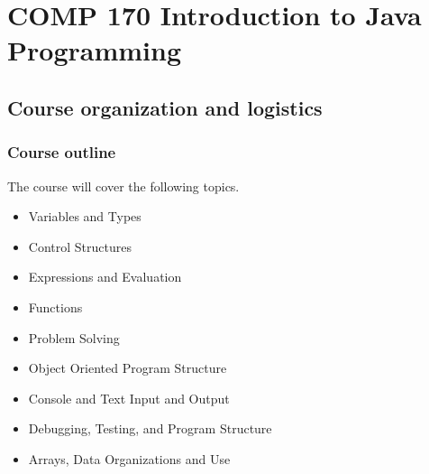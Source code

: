 \documentclass[letterpaper,10pt,english]{sphinxmanual}
\begin{document}
\chapter{COMP 170 Introduction to Java Programming}
\label{\detokenize{COMP170/introduction:comp-170-introduction-to-java-programming}}\label{\detokenize{COMP170/introduction::doc}}

\section{Course organization and logistics}
\label{\detokenize{COMP170/organization:course-organization-and-logistics}}\label{\detokenize{COMP170/organization::doc}}

\subsection{Course outline}
\label{\detokenize{COMP170/organization:course-outline}}
The course will cover the following topics.
\begin{itemize}
\item {} 
Variables and Types

\item {} 
Control Structures

\item {} 
Expressions and Evaluation

\item {} 
Functions

\item {} 
Problem Solving

\item {} 
Object Oriented Program Structure

\item {} 
Console and Text Input and Output

\item {} 
Debugging, Testing, and Program Structure

\item {} 
Arrays, Data Organizations and Use

\end{itemize}
\end{document}
